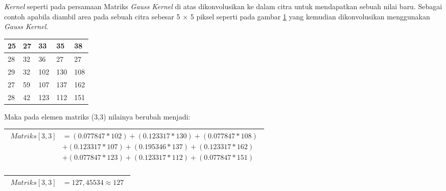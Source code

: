 \noindent\textit{Kernel} seperti pada persamaan Matriks \textit{Gauss Kernel} di atas dikonvolusikan ke dalam citra untuk mendapatkan sebuah nilai baru. Sebagai contoh apabila diambil area pada sebuah citra sebesar 5 $\times$ 5 piksel seperti pada gambar \ref{fig:MatriksCitra} yang kemudian dikonvolusikan menggunakan \textit{Gauss Kernel}.

\begin{table}[H]
	\centering
	\begin{small}
		\begin{tabular}{|p{1cm}|p{1cm}|p{1cm}|p{1cm}|p{1cm}|}
			\hline
			25 & 27 & 33 & 35 & 38 \\
			\hline
			28 & 32 & 36 & 27 & 27 \\
			\hline
			29 & 32 & 102 & 130 & 108 \\
			\hline
			27 & 59 & 107 & 137 & 162 \\
			\hline
			28 & 42 & 123 & 112 & 151 \\\hline
		\end{tabular}
	\end{small}
	\label{fig:MatriksCitra}
\end{table}

\noindent Maka pada elemen matriks (3,3) nilainya berubah menjadi:
\begin{table}[H]
	\begin{adjustbox}{width=1\textwidth}
		\begin{tabular}{|p{13.55cm}|}
			\hline
			\begin{equation}\nonumber
			\begin{aligned}
			Matriks[3,3] &= (0.077847 * 102) + (0.123317 * 130) + (0.077847 * 108) \\
						 &+ (0.123317 * 107) + (0.195346 * 137) + (0.123317 * 162) \\
						 &+ (0.077847 * 123) + (0.123317 * 112) + (0.077847 * 151)\\
			\end{aligned}
			\end{equation}\\
			\hline
		\end{tabular}
	\end{adjustbox}
\end{table}

\begin{table}[H]
	\begin{adjustbox}{width=1\textwidth}
		\begin{tabular}{|p{13.55cm}|}
			\hline
			\begin{equation}\nonumber
			\begin{aligned}
			Matriks[3,3] &= 127,45534 \approx 127
			\end{aligned}
			\end{equation}\\
			\hline
		\end{tabular}
	\end{adjustbox}
\end{table}


